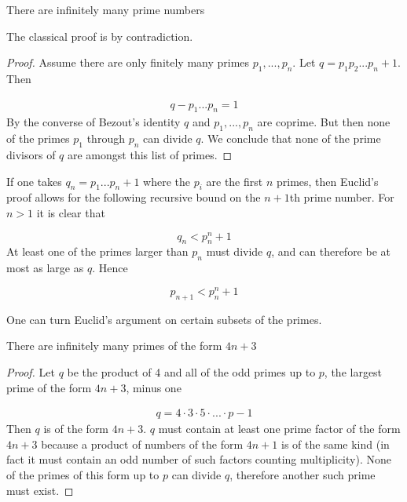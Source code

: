 \begin{theorem}
    There are infinitely many prime numbers
\end{theorem}
The classical proof is by contradiction.
\begin{proof}
    Assume there are only finitely many primes $p_1,...,p_n$. Let $q = p_1 p_2 ... p_n + 1$. Then

    \begin{align*}
        q - p_1...p_n = 1
    \end{align*}
    \noi
    By the converse of Bezout's identity $q$ and $p_1,...,p_n$ are coprime. But then none of the primes $p_1$ through $p_n$ can divide $q$. We conclude that 
    none of the prime divisors of $q$ are amongst this list of primes.
\end{proof}

\begin{remark}
    If one takes $q_n = p_1 ... p_n+1$ where the $p_i$ are the first $n$ primes, then Euclid's proof allows for the following recursive bound on the $n+1$th prime number. 
    For $n>1$ it is clear that

    \begin{equation*}
        q_n < p_n^n + 1
    \end{equation*}
    At least one of the primes larger than $p_n$ must divide $q$, and can therefore be at most as large as $q$. Hence

    \begin{equation*}
        p_{n+1} < p_n^n + 1
    \end{equation*}

\end{remark}

\noi
One can turn Euclid's argument on certain subsets of the primes.

\begin{theorem}
    There are infinitely many primes of the form $4n+3$
\end{theorem}

\begin{proof}
    Let $q$ be the product of 4 and all of the odd primes up to $p$, the largest prime of the form $4n+3$, minus one

    \begin{align*}
        q = 4\cdot 3 \cdot 5 \cdot ... \cdot p - 1
    \end{align*}
    Then $q$ is of the form $4n+3$. $q$ must contain at least one prime factor of the form $4n+3$ because a product of numbers of the form $4n+1$ 
    is of the same kind (in fact it must contain an odd number of such factors counting multiplicity). None of the primes of this form up to $p$ can divide $q$, 
    therefore another such prime must exist.
\end{proof}

